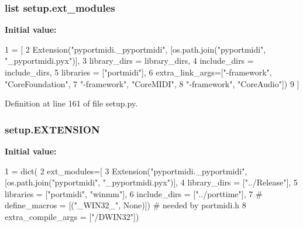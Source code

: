 \subsubsection[{\texorpdfstring{ext\+\_\+modules}{ext_modules}}]{\setlength{\rightskip}{0pt plus 5cm}list setup.\+ext\+\_\+modules}\hypertarget{namespacesetup_a75e1b9b094c785fb1fabf9342f43ee73}{}\label{namespacesetup_a75e1b9b094c785fb1fabf9342f43ee73}
{\bfseries Initial value\+:}
\begin{DoxyCode}
1 = [ 
2             Extension(\textcolor{stringliteral}{"pyportmidi.\_pyportmidi"}, [os.path.join(\textcolor{stringliteral}{"pyportmidi"}, \textcolor{stringliteral}{"\_pyportmidi.pyx"})],
3                       library\_dirs = library\_dirs,
4                       include\_dirs = include\_dirs,
5                       libraries = [\textcolor{stringliteral}{"portmidi"}],
6                       extra\_link\_args=[\textcolor{stringliteral}{"-framework"}, \textcolor{stringliteral}{"CoreFoundation"},
7                                        \textcolor{stringliteral}{"-framework"}, \textcolor{stringliteral}{"CoreMIDI"},
8                                        \textcolor{stringliteral}{"-framework"}, \textcolor{stringliteral}{"CoreAudio"}])
9         ]
\end{DoxyCode}


Definition at line 161 of file setup.\+py.

\subsubsection[{\texorpdfstring{E\+X\+T\+E\+N\+S\+I\+ON}{EXTENSION}}]{\setlength{\rightskip}{0pt plus 5cm}setup.\+E\+X\+T\+E\+N\+S\+I\+ON}\hypertarget{namespacesetup_a6b7740a5f684fdfac2d9e8625a2c9a29}{}\label{namespacesetup_a6b7740a5f684fdfac2d9e8625a2c9a29}
{\bfseries Initial value\+:}
\begin{DoxyCode}
1 = dict(
2         ext\_modules=[ 
3             Extension(\textcolor{stringliteral}{"pyportmidi.\_pyportmidi"}, [os.path.join(\textcolor{stringliteral}{"pyportmidi"}, \textcolor{stringliteral}{"\_pyportmidi.pyx"})],
4                       library\_dirs = [\textcolor{stringliteral}{"../Release"}],
5                       libraries = [\textcolor{stringliteral}{"portmidi"}, \textcolor{stringliteral}{"winmm"}],
6                       include\_dirs = [\textcolor{stringliteral}{"../porttime"}],
7 \textcolor{comment}{#                  define\_macros = [("\_WIN32\_", None)]) # needed by portmidi.h}
8                       extra\_compile\_args = [\textcolor{stringliteral}{"/DWIN32"}])
\end{DoxyCode}


